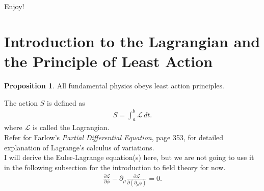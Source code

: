 \documentclass[a4paper,11pt]{article}
\numberwithin{equation}{section}
\theoremstyle{definition}
\newtheorem{prop}{Proposition}[section]
\begin{document}
Enjoy!


\newpage

\tableofcontents

\newpage
\section{Introduction to the Lagrangian and the Principle of Least Action}
\begin{prop}
	All fundamental physics obeys least action principles.
\end{prop}
The action $S$ is defined as
\begin{align}
S = \int_{a}^{b}\mathcal{L}\,dt.
\end{align}
where $\mathcal{L}$ is called the Lagrangian.\\

Refer for Farlow's \textit{Partial Differential Equation}, page 353, for detailed explanation of Lagrange's calculus of variations.\\

I will derive the Euler-Lagrange equation(s) here, but we are not going to use it in the following subsection for the introduction to field theory for now. \\
\begin{align}
\frac{\partial \mathcal{L}}{\partial \phi} - \partial_\mu\frac{\partial \mathcal{L}}{\partial(\partial_\mu \phi)} = 0.
\end{align}
\end{document}

